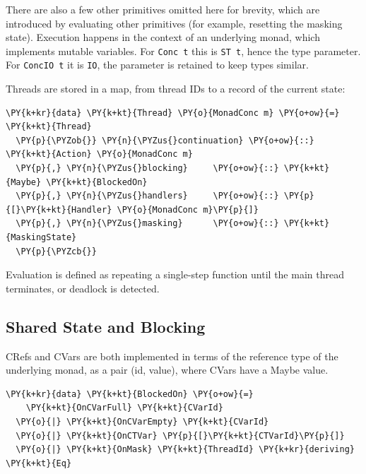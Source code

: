 There are also a few other primitives omitted here for brevity, which
are introduced by evaluating other primitives (for example, resetting
the masking state). Execution happens in the context of an underlying
monad, which implements mutable variables. For \texttt{Conc t} this is
\texttt{ST t}, hence the type parameter. For \texttt{ConcIO t} it is
\texttt{IO}, the parameter is retained to keep types similar.

Threads are stored in a map, from thread IDs to a record of the
current state:


\begin{Verbatim}[commandchars=\\\{\}]
\PY{k+kr}{data} \PY{k+kt}{Thread} \PY{o}{MonadConc m} \PY{o+ow}{=} \PY{k+kt}{Thread}
  \PY{p}{\PYZob{}} \PY{n}{\PYZus{}continuation} \PY{o+ow}{::} \PY{k+kt}{Action} \PY{o}{MonadConc m}
  \PY{p}{,} \PY{n}{\PYZus{}blocking}     \PY{o+ow}{::} \PY{k+kt}{Maybe} \PY{k+kt}{BlockedOn}
  \PY{p}{,} \PY{n}{\PYZus{}handlers}     \PY{o+ow}{::} \PY{p}{[}\PY{k+kt}{Handler} \PY{o}{MonadConc m}\PY{p}{]}
  \PY{p}{,} \PY{n}{\PYZus{}masking}      \PY{o+ow}{::} \PY{k+kt}{MaskingState}
  \PY{p}{\PYZcb{}}
\end{Verbatim}

Evaluation is defined as repeating a single-step function until the
main thread terminates, or deadlock is detected.

\subsection*{Shared State and Blocking}
\label{sec:dejafu-impl-state}

CRefs and CVars are both implemented in terms of the reference type of
the underlying monad, as a pair (id, value), where CVars have a Maybe
value.


\begin{Verbatim}[commandchars=\\\{\}]
\PY{k+kr}{data} \PY{k+kt}{BlockedOn} \PY{o+ow}{=}
    \PY{k+kt}{OnCVarFull} \PY{k+kt}{CVarId}
  \PY{o}{|} \PY{k+kt}{OnCVarEmpty} \PY{k+kt}{CVarId}
  \PY{o}{|} \PY{k+kt}{OnCTVar} \PY{p}{[}\PY{k+kt}{CTVarId}\PY{p}{]}
  \PY{o}{|} \PY{k+kt}{OnMask} \PY{k+kt}{ThreadId} \PY{k+kr}{deriving} \PY{k+kt}{Eq}
\end{Verbatim}

